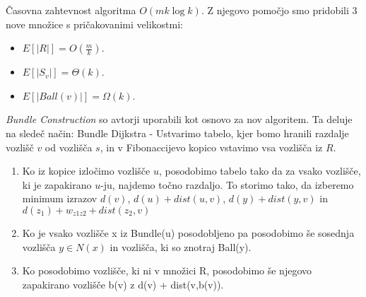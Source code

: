 \documentclass{article}
\begin{document}
Časovna zahtevnost algoritma $O(m k \log k)$. Z njegovo pomočjo smo pridobili 3 nove množice s pričakovanimi velikostmi:
\begin{itemize}
  \item $E[|R|] = O(\frac{m}{k})$.
  \item $E[|S_v|] = \Theta(k)$.
  \item $E[|Ball(v)|] = \Omega(k)$.
\end{itemize}

\textit{Bundle Construction} so avtorji uporabili kot osnovo za nov algoritem. Ta deluje na sledeč način:
Bundle Dijkstra - Ustvarimo tabelo, kjer bomo hranili razdalje vozlišč $v$ od vozlišča $s$, in v Fibonaccijevo kopico vstavimo vsa vozlišča iz $R$.
\begin{enumerate}
  \item
  Ko iz kopice izločimo vozlišče $u$, posodobimo tabelo tako da za vsako vozlišče, ki je zapakirano $u$-ju, najdemo točno razdaljo. To storimo tako, da izberemo minimum izrazov $d(v)$, $d(u) + dist(u,v)$, $d(y) + dist(y,v)$ in $d(z_1) + w_{z1z2} + dist(z_2,v)$
  \item
  Ko je vsako vozlišče x iz Bundle(u) posodobljeno pa posodobimo še sosednja vozlišča $y \in N(x)$ in vozlišča, ki so znotraj Ball(y).
  \item
  Ko posodobimo vozlišče, ki ni v množici R, posodobimo še njegovo zapakirano vozlišče b(v) z d(v) + dist(v,b(v)).


\end{enumerate}
\end{document}
